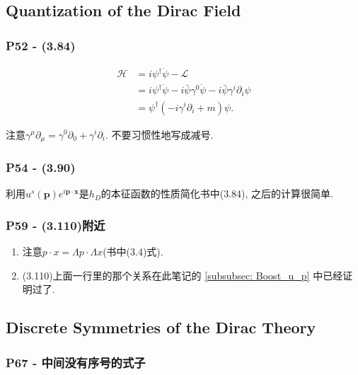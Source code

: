 \documentclass[cn,hazy,green,11pt,device=normal,chinesefont=founder]{elegantnote}
\begin{document}
\subsection{Quantization of the Dirac Field}

\subsubsection{{P52} - (3.84)}
\begin{equation}
  \begin{aligned}
    \mathcal{H} &= i {\psi}^\dagger \dot{\psi} - \mathcal{L} \\
    &= i {\psi}^\dagger \dot{\psi} - i \bar{\psi} \gamma^0 \dot{\psi} - i \bar{\psi} \gamma^i \partial_i \psi \\
    &= {\psi}^\dagger (-i \gamma^i \partial_i + m) \psi. 
  \end{aligned}
\end{equation}

\begin{remark}
  注意$\gamma^\mu \partial_\mu = \gamma^0 \partial_0 + \gamma^i \partial_i$. 不要习惯性地写成减号. 
\end{remark}

\subsubsection{P54 - (3.90)}

利用$u^s(\mathbf{p})e^{i\mathbf{p} \cdot \mathbf{x}}$是$h_D$的本征函数的性质简化书中(3.84), 之后的计算很简单. 

\subsubsection{P59 - (3.110)附近}
\begin{enumerate}
  \item 注意$p\cdot x = \Lambda p\cdot \Lambda x$(书中(3.4)式).
  \item (3.110)上面一行里的那个关系在此笔记的 \ref{subsubsec: Boost_u_p} 中已经证明过了. 
\end{enumerate}

\subsection{Discrete Symmetries of the Dirac Theory}

\subsubsection{P67 - 中间没有序号的式子} 
\end{document}
